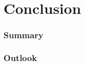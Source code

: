 \documentclass[../main.tex]{subfiles}
\begin{document}
\chapter{Conclusion}\label{ch:conclusion}

\subsection*{Summary}

\subsection*{Outlook}
\end{document}
